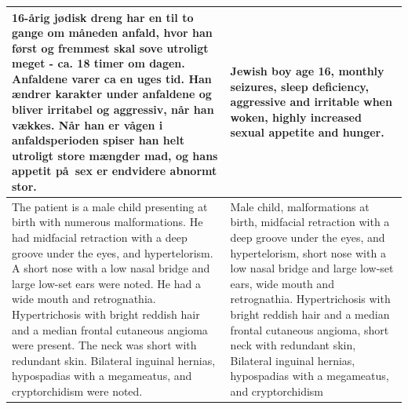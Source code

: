 \documentclass[xcolor=table]{beamer}
\begin{document}
\begin{frame}
\begin{scriptsize}
{      \begin{tabular}{| p{5cm} | p{5cm} |}
        
        \hline
        
        16-\aa rig j\o disk dreng har en til to gange om m\aa neden anfald,
        hvor han f\o rst og fremmest skal sove utroligt meget - ca. 18
        timer om dagen. Anfaldene varer ca en uges tid. Han \ae ndrer
        karakter under anfaldene og bliver irritabel og aggressiv, n\aa r
        han v\ae kkes. N\aa r han er v\aa gen i anfaldsperioden spiser han
        helt utroligt store m\ae ngder mad, og hans appetit p\aa\ sex er
        endvidere abnormt stor. & Jewish boy age 16, monthly seizures,
        sleep deficiency, aggressive and irritable when woken, highly
        increased sexual appetite and hunger.\\
        
        \hline
        
        The patient is a male child presenting at birth with numerous
        malformations. He had midfacial retraction with a deep groove
        under the eyes, and hypertelorism. A short nose with a low nasal
        bridge and large low-set ears were noted. He had a wide mouth and
        retrognathia. Hypertrichosis with bright reddish hair and a median
        frontal cutaneous angioma were present. The neck was short with
        redundant skin. Bilateral inguinal hernias, hypospadias with a
        megameatus, and cryptorchidism were noted. & Male child,
        malformations at birth, midfacial retraction with a deep groove
        under the eyes, and hypertelorism, short nose with a low nasal
        bridge and large low-set ears, wide mouth and
        retrognathia. Hypertrichosis with bright reddish hair and a median
        frontal cutaneous angioma, short neck with redundant skin,
        Bilateral inguinal hernias, hypospadias with a megameatus, and
        cryptorchidism \\
        
        \hline
        
      \end{tabular}
    }      
      
\end{scriptsize}
\end{frame}
\end{document}
